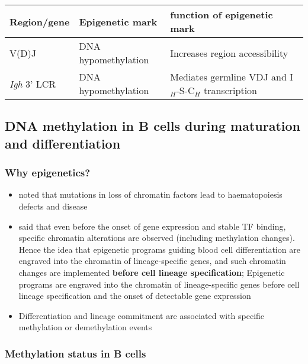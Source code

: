 \documentclass[12pt]{article}
\begin{document}
			\begin{table}[h]
				\begin{tabular}{l l l}
					Region/gene         & Epigenetic mark     & function of epigenetic mark                           \\
					\hline
					V(D)J               & DNA hypomethylation & Increases region accessibility                        \\
					\textit{Igh} 3' LCR & DNA hypomethylation & Mediates germline VDJ and I$_H$-S-C$_H$ transcription 
				\end{tabular}
			\end{table}
		
		\subsection{DNA methylation in B cells during maturation and differentiation}
			
			\subsubsection{Why epigenetics?}
				
				\begin{itemize}
					\item \citet{Lara14} noted that mutations in loss of chromatin factors lead to haematopoiesis defects and disease
					\item \citet{Tagoh04} said that even before the onset of gene expression and stable TF binding, specific chromatin alterations are observed (including methylation changes). Hence the idea that epigenetic programs guiding blood cell differentiation are engraved into the chromatin of lineage-specific genes, and such chromatin changes are implemented \textbf{before cell lineage specification}; Epigenetic programs are engraved into the chromatin of lineage-specific genes before cell lineage specification and the onset of detectable gene expression
					\item Differentiation and lineage commitment are associated with specific methylation or demethylation events \citep{Schmidl09}
				\end{itemize}

			\subsubsection{Methylation status in B cells}
			
\end{document}
